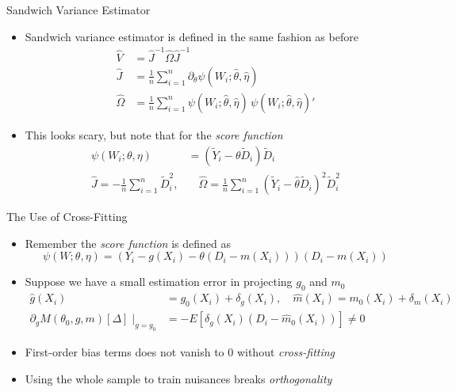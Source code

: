 \documentclass[aspectratio=1610,12pt,xcolor=dvipsnames]{beamer}
\begin{document}
\begin{frame}{Sandwich Variance Estimator}

\begin{itemize}
    \item Sandwich variance estimator is defined in the same fashion as before
    \begin{align*}
    \hat V &= \hat J^{-1}\hat \Omega \hat J^{-1} \\
    \hat J &= \frac{1}{n}\sum_{i=1}^n 
        \partial_\theta \psi(W_i;\hat\theta,\hat\eta) \\
    \hat \Omega &= \frac{1}{n}\sum_{i=1}^n 
        \psi(W_i;\hat\theta,\hat\eta)\,\psi(W_i;\hat\theta,\hat\eta)'
    \end{align*}
    \item This looks scary, but note that for the \textit{score function}
    \begin{align*}
    \psi(W_i;\theta,\eta) &= 
    (\tilde Y_i - \theta \tilde D_i)\tilde D_i \\
    \hat J = -\frac{1}{n}\sum_{i=1}^n \tilde D_i^2, &\quad
    \hat \Omega = \frac{1}{n}\sum_{i=1}^n 
    (\tilde Y_i - \hat\theta \tilde D_i)^2 \tilde D_i^2
    \end{align*}
\end{itemize}
\end{frame}

\begin{frame}{The Use of Cross-Fitting}

\begin{itemize}
    \item Remember the \textit{score function} is defined as
    \[
    \psi(W;\theta,\eta) = (Y_i - g(X_i) - \theta(D_i-m(X_i)))(D_i-m(X_i))
    \]
    \item Suppose we have a small estimation error in projecting $g_0$ and $m_0$
    \begin{align*}
    \hat g(X_i) &= g_0(X_i) + \delta_g(X_i), \quad 
    \hat m(X_i) = m_0(X_i) + \delta_m(X_i) \\
    \partial_g M(\theta_0,g,m)[\Delta]\;\Big|_{g=g_0} 
    &= -E[\delta_g(X_i)(D_i-\hat m_0(X_i))] \neq 0
    \end{align*}
     \item First-order bias terms does not vanish to 0 without \textit{cross-fitting}
     \item Using the whole sample to train nuisances breaks \textit{orthogonality}
\end{itemize}
\end{frame}
\end{document}
